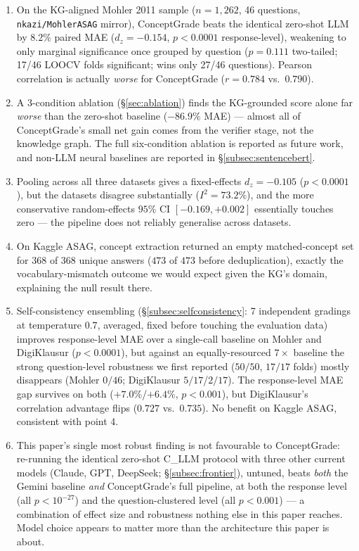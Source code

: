\documentclass[conference]{IEEEtran}
\begin{document}
\begin{enumerate}
  \item On the KG-aligned Mohler 2011 sample ($n=1{,}262$, 46
        questions, \texttt{nkazi/MohlerASAG} mirror), ConceptGrade
        beats the identical zero-shot LLM by $8.2\%$ paired MAE
        ($d_z=-0.154$, $p<0.0001$ response-level), weakening to only
        marginal significance once grouped by question ($p=0.111$
        two-tailed; 17/46 LOOCV folds significant; wins only 27/46
        questions). Pearson correlation is actually \emph{worse} for
        ConceptGrade ($r=0.784$ vs.\ $0.790$).
  \item A 3-condition ablation (\S\ref{sec:ablation}) finds the
        KG-grounded score alone far \emph{worse} than the zero-shot
        baseline ($-86.9\%$ MAE) --- almost all of ConceptGrade's small
        net gain comes from the verifier stage, not the knowledge
        graph. The full six-condition ablation is reported as future
        work, and non-LLM neural baselines are reported in
        \S\ref{subsec:sentencebert}.
  \item Pooling across all three datasets gives a fixed-effects
        $d_z=-0.105$ ($p<0.0001$), but the datasets disagree
        substantially ($I^2=73.2\%$), and the more conservative
        random-effects $95\%$ CI $[-0.169,+0.002]$ essentially touches
        zero --- the pipeline does not reliably generalise across
        datasets.
  \item On Kaggle ASAG, concept extraction returned an empty
        matched-concept set for $368$ of $368$ unique answers ($473$ of
        $473$ before deduplication), exactly the vocabulary-mismatch
        outcome we would expect given the KG's domain, explaining the
        null result there.
  \item Self-consistency ensembling (\S\ref{subsec:selfconsistency}: 7
        independent gradings at temperature $0.7$, averaged, fixed
        before touching the evaluation data) improves response-level
        MAE over a single-call baseline on Mohler and DigiKlausur
        ($p<0.0001$), but against an equally-resourced $7\times$
        baseline the strong question-level robustness we first
        reported ($50/50$, $17/17$ folds) mostly disappears (Mohler
        $0/46$; DigiKlausur $5/17$/$2/17$). The response-level MAE gap
        survives on both ($+7.0\%$/$+6.4\%$, $p<0.001$), but
        DigiKlausur's correlation advantage flips ($0.727$ vs.\
        $0.735$). No benefit on Kaggle ASAG, consistent with point 4.
  \item This paper's single most robust finding is not favourable to
        ConceptGrade: re-running the identical zero-shot C\_LLM
        protocol with three other current models (Claude, GPT,
        DeepSeek; \S\ref{subsec:frontier}), untuned, beats \emph{both}
        the Gemini baseline \emph{and} ConceptGrade's full pipeline, at
        both the response level (all $p<10^{-27}$) and the
        question-clustered level (all $p<0.001$) --- a combination of
        effect size and robustness nothing else in this paper reaches.
        Model choice appears to matter more than the architecture this
        paper is about.
\end{enumerate}
\end{document}
